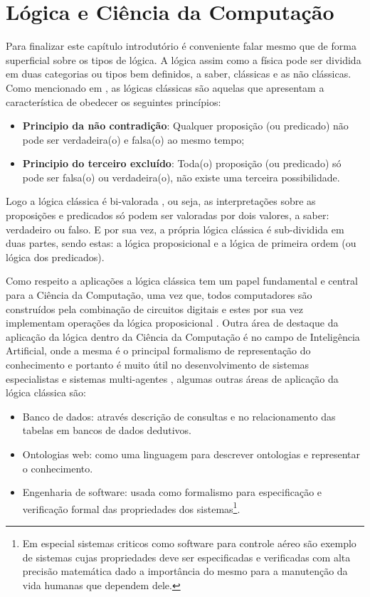 \section{Lógica e Ciência da Computação}\label{sec:Tipos-Logica-Aplicacoes}


Para finalizar este capítulo introdutório é conveniente falar mesmo que de forma superficial sobre os tipos de lógica. A lógica assim como a física pode ser dividida em duas categorias ou tipos bem definidos, a saber, clássicas e as não
clássicas. Como mencionado em  \cite{BenjaV1, edgar2002}, as lógicas clássicas são aquelas que apresentam a característica de obedecer os seguintes princípios: 

\begin{itemize}
	\item \textbf{Principio da não contradição}: Qualquer proposição (ou predicado) não pode ser verdadeira(o) e falsa(o) ao mesmo tempo;
	\item \textbf{Principio do terceiro excluído}: Toda(o) proposição  (ou predicado) só pode ser falsa(o) ou verdadeira(o), não existe uma terceira possibilidade. 
\end{itemize}

Logo a lógica clássica é bi-valorada \cite{edgar2002}, ou seja, as interpretações sobre as proposições e predicados só podem ser valoradas por dois valores, a saber: verdadeiro ou falso. E por sua vez, a própria lógica clássica é sub-dividida em duas partes, sendo estas: a lógica proposicional e a lógica de primeira ordem (ou lógica dos predicados).

Como respeito a aplicações a lógica clássica tem um papel fundamental e central para a Ciência da Computação, uma vez que, todos computadores são construídos pela combinação de circuitos digitais e estes por sua vez implementam operações da lógica proposicional \cite{abe2002-logica, nunes2008}. Outra área de destaque da aplicação da lógica dentro da Ciência da Computação é no campo de Inteligência Artificial, onde a mesma é o principal formalismo de representação do conhecimento e portanto é muito útil no desenvolvimento de sistemas especialistas e sistemas multi-agentes \cite{BenjaV1}, algumas outras áreas de aplicação da lógica clássica são:

\begin{itemize}
	\item Banco de dados: através descrição de consultas e no relacionamento das
tabelas em bancos de dados dedutivos.
	\item Ontologias web: como uma linguagem para descrever
ontologias e representar o conhecimento.
	\item Engenharia de software: usada como formalismo para especificação e verificação formal das propriedades dos sistemas\footnote{Em especial sistemas criticos como software para controle aéreo são exemplo de sistemas cujas propriedades deve ser especificadas e verificadas com alta precisão matemática dado a importância do mesmo para a manutenção da vida humanas que dependem dele.}.
\end{itemize}

